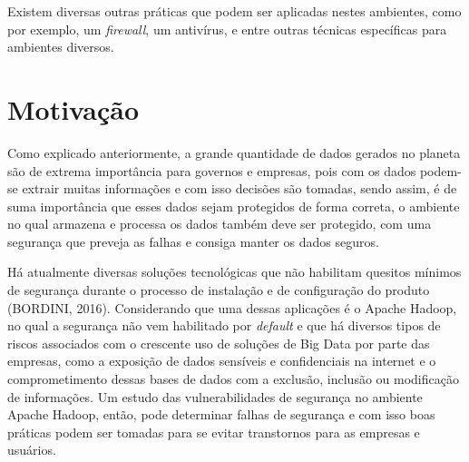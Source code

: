 Existem diversas outras práticas que podem ser aplicadas nestes ambientes, como por exemplo, um \textit{firewall}, um antivírus, e entre outras técnicas específicas para ambientes diversos.

\section{Motivação}

Como explicado anteriormente, a grande quantidade de dados gerados no planeta são de extrema importância para governos e empresas, pois com os dados podem-se extrair muitas informações e com isso decisões são tomadas, sendo assim, é de suma importância que esses dados sejam protegidos de forma correta, o ambiente no qual armazena e processa os dados também deve ser protegido, com uma segurança que preveja as falhas e consiga manter os dados seguros.

Há atualmente diversas soluções tecnológicas que não habilitam quesitos mínimos de segurança durante o processo de instalação e de configuração do produto (BORDINI, 2016). Considerando que uma dessas aplicações é o Apache Hadoop, no qual a segurança não vem habilitado por \textit{default} e que há diversos tipos de riscos associados com o crescente uso de soluções de Big Data por parte das empresas, como a exposição de dados sensíveis e confidenciais na internet e o comprometimento dessas bases de dados com a exclusão, inclusão ou modificação de informações. Um estudo das vulnerabilidades de segurança no ambiente Apache Hadoop, então, pode determinar falhas de segurança e com isso boas práticas podem ser tomadas para se evitar transtornos para as empresas e usuários.

